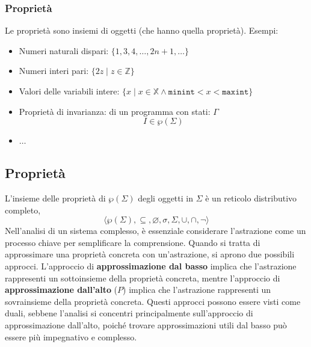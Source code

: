 \subsubsection{Proprietà}
Le proprietà sono insiemi di oggetti (che hanno quella proprietà). Esempi:
\begin{itemize}
    \item Numeri naturali dispari: $\{1, 3, 4, \dots, 2n + 1, \dots\}$
    \item Numeri interi pari: $\{2z \mid z \in \mathbb{Z}\}$
    \item Valori delle variabili intere: $\{x \mid x \in \mathbb{X} \land \texttt{minint} < x < \texttt{maxint}\}$
    \item Proprietà di invarianza: di un programma con stati: $\Gamma$
    \[
      I \in \wp(\Sigma)
    \]
    \item $\ldots$
\end{itemize}
\subsection{Proprietà}
L'insieme delle proprietà di $\wp(\Sigma)$ degli oggetti in $\Sigma$ è un reticolo distributivo completo, 
\[
  \langle \wp(\Sigma), \subseteq, \varnothing, \sigma, \Sigma, \cup, \cap, \neg  \rangle 
\]
Nell'analisi di un sistema complesso, è essenziale considerare l'astrazione come un processo chiave
per semplificare la comprensione. Quando si tratta di approssimare una proprietà concreta con
un'astrazione, si aprono due possibili approcci.
L'approccio di \textbf{approssimazione dal basso} implica che l'astrazione rappresenti un sottoinsieme
della proprietà concreta,
mentre l'approccio di \textbf{approssimazione dall'alto} ($P$) implica che l'astrazione rappresenti un
sovrainsieme della proprietà concreta. Questi approcci possono essere visti come duali,
sebbene l'analisi si concentri principalmente sull'approccio di approssimazione dall'alto,
poiché trovare approssimazioni utili dal basso può essere più impegnativo e complesso.

\begin{figure}[H]
  \centering
\end{figure}
